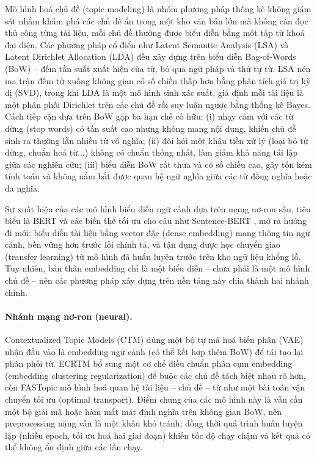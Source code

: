 \documentclass[11pt]{article}
\begin{document}
Mô hình hoá chủ đề (topic modeling) là nhóm phương pháp thống kê không giám
sát nhằm khám phá các chủ đề ẩn trong một kho văn bản lớn mà không cần đọc
thủ công từng tài liệu, mỗi chủ đề thường được biểu diễn bằng một tập từ
khoá đại diện. Các phương pháp cổ điển như Latent Semantic Analysis (LSA)
\citep{deerwester1988lsa} và Latent Dirichlet Allocation (LDA)
\citep{blei2003lda} đều xây dựng trên biểu diễn Bag-of-Words (BoW) -- đếm
tần suất xuất hiện của từ, bỏ qua ngữ pháp và thứ tự từ. LSA nén ma trận
đếm từ xuống không gian có số chiều thấp hơn bằng phân tích giá trị kỳ dị
(SVD), trong khi LDA là một mô hình sinh xác suất, giả định mỗi tài liệu là
một phân phối Dirichlet trên các chủ đề rồi suy luận ngược bằng thống kê
Bayes. Cách tiếp cận dựa trên BoW gặp ba hạn chế cố hữu: (i) nhạy cảm với
các từ dừng (stop words) có tần suất cao nhưng không mang nội dung, khiến
chủ đề sinh ra thường lẫn nhiều từ vô nghĩa; (ii) đòi hỏi một khâu tiền xử
lý (loại bỏ từ dừng, chuẩn hoá từ...) không có chuẩn thống nhất, làm giảm
khả năng tái lập giữa các nghiên cứu; (iii) biểu diễn BoW rất thưa và có số
chiều cao, gây tốn kém tính toán và không nắm bắt được quan hệ ngữ nghĩa
giữa các từ đồng nghĩa hoặc đa nghĩa.

Sự xuất hiện của các mô hình biểu diễn ngữ cảnh dựa trên mạng nơ-ron sâu,
tiêu biểu là BERT \citep{devlin2019bert} và các biến thể tối ưu cho câu như
Sentence-BERT \citep{reimers2019sbert}, mở ra hướng đi mới: biểu diễn tài
liệu bằng vector đặc (dense embedding) mang thông tin ngữ cảnh, bền vững
hơn trước lỗi chính tả, và tận dụng được học chuyển giao (transfer learning)
từ mô hình đã huấn luyện trước trên kho ngữ liệu khổng lồ. Tuy nhiên, bản
thân embedding chỉ là một biểu diễn -- chưa phải là một mô hình chủ đề --
nên các phương pháp xây dựng trên nền tảng này chia thành hai nhánh chính.

\paragraph{Nhánh mạng nơ-ron (neural).} Contextualized Topic Models (CTM)
\citep{bianchi2021ctm} dùng một bộ tự mã hoá biến phân (VAE) nhận đầu vào là
embedding ngữ cảnh (có thể kết hợp thêm BoW) để tái tạo lại phân phối từ.
ECRTM \citep{wu2023ecrtm} bổ sung một cơ chế điều chuẩn phân cụm embedding
(embedding clustering regularization) để buộc các chủ đề tách biệt nhau rõ
hơn, còn FASTopic \citep{wu2024fastopic} mô hình hoá quan hệ tài liệu -- chủ
đề -- từ như một bài toán vận chuyển tối ưu (optimal transport). Điểm chung
của các mô hình này là vẫn cần một bộ giải mã hoặc hàm mất mát định nghĩa
trên không gian BoW, nên preprocessing nặng vẫn là một khâu khó tránh; đồng
thời quá trình huấn luyện lặp (nhiều epoch, tối ưu hoá hai giai đoạn) khiến
tốc độ chạy chậm và kết quả có thể không ổn định giữa các lần chạy.
\end{document}
